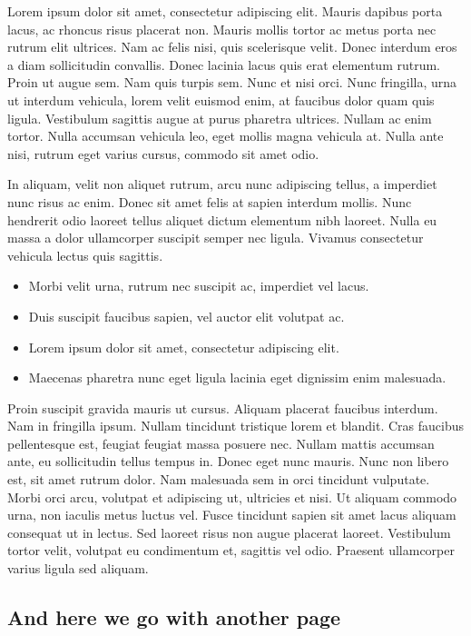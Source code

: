 \documentclass[11pt,oneside,openany]{book}
\begin{document}
Lorem ipsum dolor sit amet, consectetur adipiscing elit. Mauris dapibus porta lacus, ac rhoncus risus placerat non. Mauris mollis tortor ac metus porta nec rutrum elit ultrices. Nam ac felis nisi, quis scelerisque velit. Donec interdum eros a diam sollicitudin convallis. Donec lacinia lacus quis erat elementum rutrum. Proin ut augue sem. Nam quis turpis sem. Nunc et nisi orci. Nunc fringilla, urna ut interdum vehicula, lorem velit euismod enim, at faucibus dolor quam quis ligula. Vestibulum sagittis augue at purus pharetra ultrices. Nullam ac enim tortor. Nulla accumsan vehicula leo, eget mollis magna vehicula at. Nulla ante nisi, rutrum eget varius cursus, commodo sit amet odio.

In aliquam, velit non aliquet rutrum, arcu nunc adipiscing tellus, a imperdiet nunc risus ac enim. Donec sit amet felis at sapien interdum mollis. Nunc hendrerit odio laoreet tellus aliquet dictum elementum nibh laoreet. Nulla eu massa a dolor ullamcorper suscipit semper nec ligula. Vivamus consectetur vehicula lectus quis sagittis.

\begin{itemize}
\item Morbi velit urna, rutrum nec suscipit ac, imperdiet vel lacus.
\item Duis suscipit faucibus sapien, vel auctor elit volutpat ac.
\item Lorem ipsum dolor sit amet, consectetur adipiscing elit.
\item Maecenas pharetra nunc eget ligula lacinia eget dignissim enim malesuada.
\end{itemize}

Proin suscipit gravida mauris ut cursus. Aliquam placerat faucibus interdum. Nam in fringilla ipsum. Nullam tincidunt tristique lorem et blandit. Cras faucibus pellentesque est, feugiat feugiat massa posuere nec. Nullam mattis accumsan ante, eu sollicitudin tellus tempus in. Donec eget nunc mauris. Nunc non libero est, sit amet rutrum dolor. Nam malesuada sem in orci tincidunt vulputate. Morbi orci arcu, volutpat et adipiscing ut, ultricies et nisi. Ut aliquam commodo urna, non iaculis metus luctus vel. Fusce tincidunt sapien sit amet lacus aliquam consequat ut in lectus. Sed laoreet risus non augue placerat laoreet. Vestibulum tortor velit, volutpat eu condimentum et, sagittis vel odio. Praesent ullamcorper varius ligula sed aliquam.

\subsection{And here we go with another page}\hypertarget{and-here-we-go-with-another-page}{}\label{and-here-we-go-with-another-page}
\end{document}
